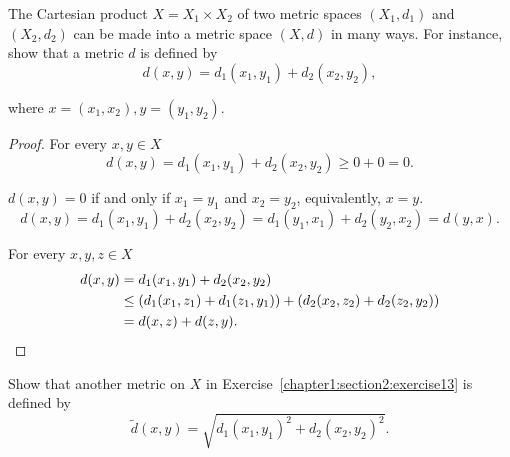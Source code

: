 \begin{exercise}\label{chapter1:section2:exercise13}
    The Cartesian product $X = X_{1} \times X_{2}$ of two metric spaces $(X_{1},  d_{1})$ and $(X_{2}, d_{2})$ can be made into a metric space $(X, d)$ in many ways. For instance, show that a metric $d$ is defined by
    \[
        d(x, y) = d_{1}(x_{1}, y_{1}) + d_{2}(x_{2}, y_{2}),
    \]

    where $x = (x_{1}, x_{2}), y = (y_{1}, y_{2})$.
\end{exercise}

\begin{proof}
    For every $x, y\in X$
    \[
        d(x, y) = d_{1}(x_{1}, y_{1}) + d_{2}(x_{2}, y_{2}) \geq 0 + 0 = 0.
    \]

    $d(x, y) = 0$ if and only if $x_{1} = y_{1}$ and $x_{2} = y_{2}$, equivalently, $x = y$.
    \[
        d(x, y) = d_{1}(x_{1}, y_{1}) + d_{2}(x_{2}, y_{2}) = d_{1}(y_{1}, x_{1}) + d_{2}(y_{2}, x_{2}) = d(y, x).
    \]

    For every $x, y, z\in X$
    \begin{align*}
        d(x, y) & = d_{1}(x_{1}, y_{1}) + d_{2}(x_{2}, y_{2})                                                    \\
                & \leq (d_{1}(x_{1}, z_{1}) + d_{1}(z_{1}, y_{1})) + (d_{2}(x_{2}, z_{2}) + d_{2}(z_{2}, y_{2})) \\
                & = d(x, z) + d(z, y).\qedhere
    \end{align*}
\end{proof}

\begin{exercise}\label{chapter1:section2:exercise14}
    Show that another metric on $X$ in Exercise~\ref{chapter1:section2:exercise13} is defined by
    \[
        \widetilde{d}(x, y) = \sqrt{{d_{1}(x_{1}, y_{1})}^{2} + {d_{2}(x_{2}, y_{2})}^{2}}.
    \]
\end{exercise}

